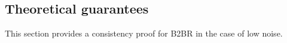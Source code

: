 \documentclass{article}
\begin{document}
\subsection{Theoretical guarantees}
\label{sec:theorem}
%

This section provides a consistency proof for B2BR in the case of low noise.
\end{document}
